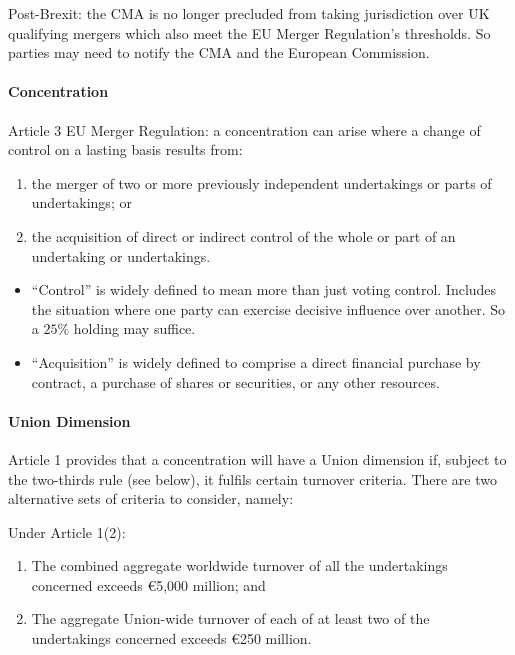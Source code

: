 \documentclass[
]{article}
\providecommand{\tightlist}{%
  \setlength{\itemsep}{0pt}\setlength{\parskip}{0pt}}
\begin{document}
Post-Brexit: the CMA is no longer precluded from taking jurisdiction
over UK qualifying mergers which also meet the EU Merger Regulation's
thresholds. So parties may need to notify the CMA and the European
Commission.

\hypertarget{concentration}{%
\paragraph{Concentration}\label{concentration}}

Article 3 EU Merger Regulation: a concentration can arise where a change
of control on a lasting basis results from:

\begin{enumerate}
\def\labelenumi{\arabic{enumi}.}
\tightlist
\item
  the merger of two or more previously independent undertakings or parts
  of undertakings; or
\item
  the acquisition of direct or indirect control of the whole or part of
  an undertaking or undertakings.
\end{enumerate}

\begin{itemize}
\tightlist
\item
  ``Control'' is widely defined to mean more than just voting control.
  Includes the situation where one party can exercise decisive influence
  over another. So a \(25\%\) holding may suffice.
\item
  ``Acquisition'' is widely defined to comprise a direct financial
  purchase by contract, a purchase of shares or securities, or any other
  resources.
\end{itemize}

\hypertarget{union-dimension}{%
\paragraph{Union Dimension}\label{union-dimension}}

Article 1 provides that a concentration will have a Union dimension if,
subject to the two-thirds rule (see below), it fulfils certain turnover
criteria. There are two alternative sets of criteria to consider,
namely:

Under Article 1(2):

\begin{enumerate}
\def\labelenumi{\arabic{enumi}.}
\tightlist
\item
  The combined aggregate worldwide turnover of all the undertakings
  concerned exceeds €5,000 million; and
\item
  The aggregate Union-wide turnover of each of at least two of the
  undertakings concerned exceeds €250 million.
\end{enumerate}
\end{document}
